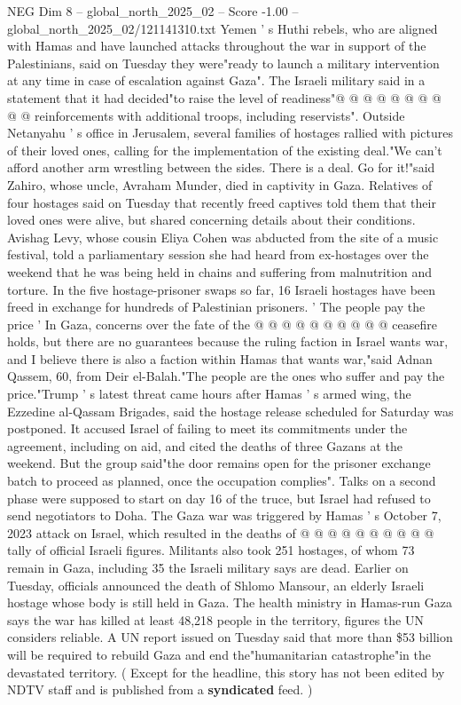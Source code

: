 \begin{textsample}{NEG Dim 8 – global\_north\_2025\_02 – Score -1.00 – global\_north\_2025\_02/121141310.txt}
Yemen ' s Huthi rebels, who are aligned with Hamas and have launched attacks throughout the war in support of the Palestinians, said on Tuesday they were"ready to launch a military intervention at any time in case of escalation against Gaza".
The Israeli military said in a statement that it had decided"to raise the level of readiness"@ @ @ @ @ @ @ @ @ @ reinforcements with additional troops, including reservists".
Outside Netanyahu ' s office in Jerusalem, several families of hostages rallied with pictures of their loved ones, calling for the implementation of the existing deal."We can't afford another arm wrestling between the sides.
There is a deal.
Go for it!"said Zahiro, whose uncle, Avraham Munder, died in captivity in Gaza.
Relatives of four hostages said on Tuesday that recently freed captives told them that their loved ones were alive, but shared concerning details about their conditions.
Avishag Levy, whose cousin Eliya Cohen was abducted from the site of a music festival, told a parliamentary session she had heard from ex-hostages over the weekend that he was being held in chains and suffering from malnutrition and torture.
In the five hostage-prisoner swaps so far, 16 Israeli hostages have been freed in exchange for hundreds of Palestinian prisoners. ' The people pay the price ' In Gaza, concerns over the fate of the @ @ @ @ @ @ @ @ @ @ ceasefire holds, but there are no guarantees because the ruling faction in Israel wants war, and I believe there is also a faction within Hamas that wants war,"said Adnan Qassem, 60, from Deir el-Balah."The people are the ones who suffer and pay the price."Trump ' s latest threat came hours after Hamas ' s armed wing, the Ezzedine al-Qassam Brigades, said the hostage release scheduled for Saturday was postponed.
It accused Israel of failing to meet its commitments under the agreement, including on aid, and cited the deaths of three Gazans at the weekend.
But the group said"the door remains open for the prisoner exchange batch to proceed as planned, once the occupation complies".
Talks on a second phase were supposed to start on day 16 of the truce, but Israel had refused to send negotiators to Doha.
The Gaza war was triggered by Hamas ' s October 7, 2023 attack on Israel, which resulted in the deaths of @ @ @ @ @ @ @ @ @ @ tally of official Israeli figures.
Militants also took 251 hostages, of whom 73 remain in Gaza, including 35 the Israeli military says are dead.
Earlier on Tuesday, officials announced the death of Shlomo Mansour, an elderly Israeli hostage whose body is still held in Gaza.
The health ministry in Hamas-run Gaza says the war has killed at least 48,218 people in the territory, figures the UN considers reliable.
A UN report issued on Tuesday said that more than \$53 billion will be required to rebuild Gaza and end the"humanitarian catastrophe"in the devastated territory. ( Except for the headline, this story has not been edited by NDTV staff and is published from a \textbf{syndicated} feed. )

\end{textsample}
